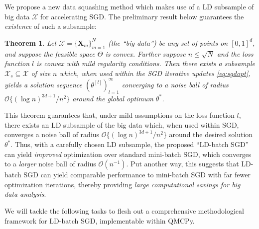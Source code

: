 \documentclass[11pt]{NSFamsart}
\newtheorem{theorem}{Theorem}
\newcommand{\bX}{{\boldsymbol{X}}}
\begin{document}
We propose a new data squashing method which makes use of a LD subsample of big data $\mathcal{X}$ for accelerating SGD. The preliminary result below guarantees the \textit{existence} of such a subsample:
\begin{theorem}
Let $\mathcal{X} = \{\bX_m\}_{m=1}^N$ (the ``big data'') be any set of points on $[0,1]^d$, and suppose the feasible space $\Theta$ is convex. Further suppose $n \leq \sqrt{N}$ and the loss function $l$ is convex with mild regularity conditions. Then there exists a subsample $\mathcal{X}_s \subseteq \mathcal{X}$ of size $n$ which, when used within the SGD iterative updates \eqref{eq:sgdopt}, yields a solution sequence $(\theta^{[l]})_{l=1}^\infty$ converging to a noise ball of radius $\mathcal{O}\{(\log n)^{3d+1}/n^2\}$ around the global optimum $\theta^*$.
\label{thm:ldsgd}
\end{theorem}
\noindent This theorem guarantees that, under mild assumptions on the loss function $l$, there exists an LD subsample of the big data which, when used within SGD, converges a noise ball of radius $\mathcal{O}\{(\log n)^{3d+1}/n^2\}$ around the desired solution $\theta^*$. Thus, with a carefully chosen LD subsample, the proposed ``LD-batch SGD'' can yield \textit{improved} optimization over standard mini-batch SGD, which converges to a \textit{larger} noise ball of radius $\mathcal{O}(n^{-1})$. Put another way, this suggests that LD-batch SGD can yield comparable performance to mini-batch SGD with far fewer optimization iterations, thereby providing \textit{large computational savings for big data analysis}.

We will tackle the following tasks to flesh out a comprehensive methodological framework for LD-batch SGD, implementable within QMCPy.


\end{document}
